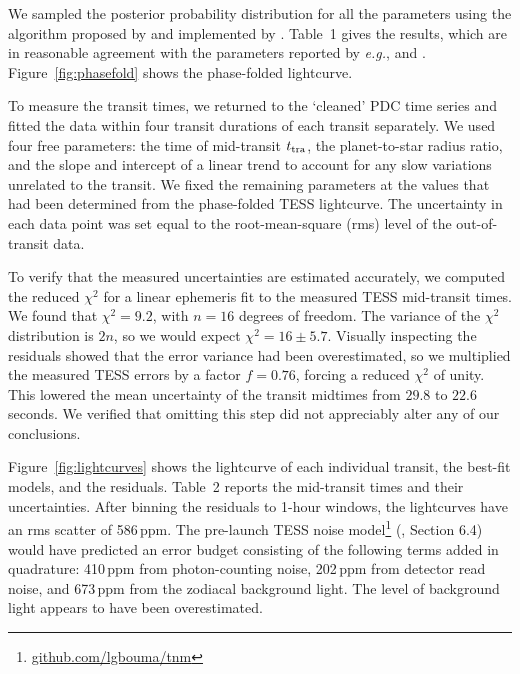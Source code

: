 \documentclass[12pt,twocolumn,tighten]{aastex62}
\begin{document}
We sampled the posterior probability distribution for all the
parameters using the algorithm proposed by
\citet{goodman_ensemble_2010} and implemented by
\citet{foreman-mackey_emcee_2013}.  Table~1 gives the results, which
are in reasonable agreement with the parameters reported by {\it
e.g.}, \citet{southworth_high-precision_2009} and
\citet{huitson_gemini_2017}.  Figure~\ref{fig:phasefold} shows the
phase-folded lightcurve.

To measure the transit times, we returned to the `cleaned' PDC time
series and fitted the data within four transit durations of each
transit separately. We used four free parameters: the time of
mid-transit $t_{\rm tra}$, the planet-to-star radius ratio, and the
slope and intercept of a linear trend to account for any slow
variations unrelated to the transit.  We fixed the remaining
parameters at the values that had been determined from the
phase-folded TESS lightcurve.  The uncertainty in each data point was
set equal to the root-mean-square (rms) level of the out-of-transit
data.

To verify that the measured uncertainties are estimated accurately, we
computed the reduced $\chi^2$ for a linear ephemeris fit to the
measured TESS mid-transit times.  We found that $\chi^2 = 9.2$, with
$n=16$ degrees of freedom.  The variance of the $\chi^2$ distribution
is $2n$, so we would expect $\chi^2 = 16 \pm 5.7$.  Visually
inspecting the residuals showed that the error variance had been
overestimated, so we multiplied the measured TESS errors by a factor
$f=0.76$, forcing a reduced $\chi^2$ of unity.  This lowered the mean
uncertainty of the transit midtimes from $29.8$ to $22.6$ seconds.  We
verified that omitting this step did not appreciably alter any of our
conclusions.

Figure~\ref{fig:lightcurves} shows the lightcurve of each individual
transit, the best-fit models, and the residuals.  Table~2 reports the
mid-transit times and their uncertainties.  After binning the
residuals to 1-hour windows, the lightcurves have an rms scatter of
586\,{\rm ppm}.  The pre-launch TESS noise
model\footnote{\url{github.com/lgbouma/tnm}}
(\citealt{winn_photonflux_2013}, \citealt{Sullivan_2015} Section 6.4)
would have predicted an error budget consisting of the following terms
added in quadrature: 410\,{\rm ppm} from photon-counting noise,
202\,{\rm ppm} from detector read noise, and 673\,{\rm ppm} from the
zodiacal background light.  The level of background light appears to
have been overestimated.
\end{document}
